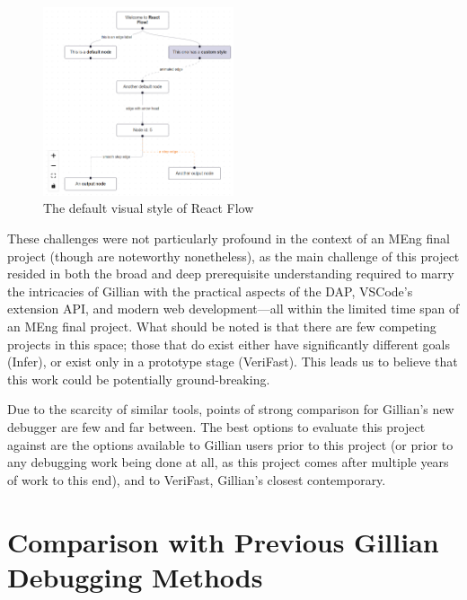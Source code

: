 \begin{figure}
  \centering
  \includegraphics[width=0.5\textwidth]{img/react-flow-default.png}
  \caption{
    The default visual style of React Flow~\cite{react-flow}
  }\label{fig:react-flow-default}
\end{figure}

These challenges were not particularly profound in the context of an MEng final
project (though are noteworthy nonetheless), as the main challenge of this
project resided in both the broad and deep prerequisite understanding required
to marry the intricacies of Gillian with the practical aspects of the DAP,
VSCode's extension API, and modern web development---all within the limited time
span of an MEng final project. What should be noted is that there are few
competing projects in this space; those that do exist either have significantly
different goals (Infer), or exist only in a prototype stage (VeriFast). This
leads us to believe that this work could be potentially ground-breaking.

Due to the scarcity of similar tools, points of strong comparison for Gillian's
new debugger are few and far between. The best options to evaluate this project
against are the options available to Gillian users prior to this project (or
prior to any debugging work being done at all, as this project comes after
multiple years of work to this end), and to VeriFast, Gillian's closest
contemporary.

\section{Comparison with Previous Gillian Debugging Methods}


